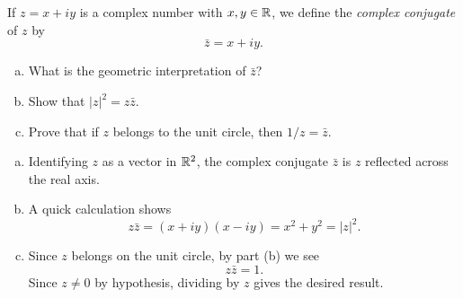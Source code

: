 \begin{exrc}[2]
    If \(z = x + iy\) is a complex number with \(x, y \in \mathbb{R}\),
    we define the \emph{complex conjugate} of \(z\) by
    \begin{equation*}
        \bar{z} = x + iy.
    \end{equation*}
    \begin{enumerate}[(a)]
    \item
        What is the geometric interpretation of \(\bar{z}\)?
    \item
        Show that \(|z|^2 = z \bar{z}\).
    \item
        Prove that if \(z\) belongs to the unit circle, then \(1 / z = \bar{z}\).
    \end{enumerate}

\begin{soln}
    \begin{enumerate}[(a)]
    \item
        Identifying \(z\) as a vector in \(\mathbb{R}^2\),
        the complex conjugate \(\bar{z}\)
        is \(z\) reflected across the real axis.
    \item
        A quick calculation shows
        \begin{equation*}
            z \bar{z} = (x + iy)(x - iy) = x^2 + y^2 = |z|^2.
        \end{equation*}
    \item
        Since \(z\) belongs on the unit circle,
        by part (b) we see
        \begin{equation*}
            z \bar{z} = 1.
        \end{equation*}
        Since \(z \neq 0\) by hypothesis,
        dividing by \(z\) gives the desired result.
    \end{enumerate}

\end{soln}
\end{exrc}
